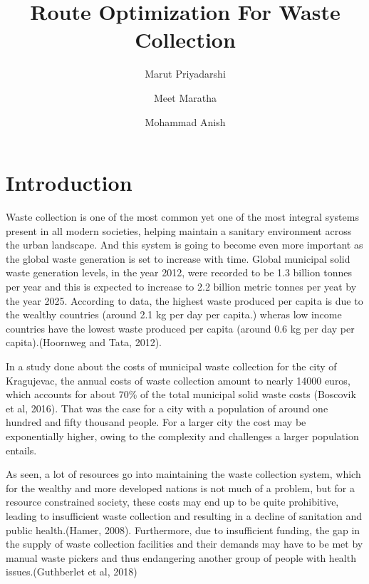 \documentclass[12pt]{article}
\begin{document}

\title{Route Optimization For Waste Collection\\}

\author[1]{Marut Priyadarshi}
\author[2]{Meet Maratha}
\author[3]{Mohammad Anish}

\maketitle

\section{Introduction}
Waste collection is one of the most common yet one of the most integral systems present in all modern societies, helping maintain a sanitary environment across the urban landscape. And this system is going to become even more important as the global waste generation is set to increase with time. Global municipal solid waste generation levels, in the year 2012, were recorded to be 1.3 billion tonnes per year and this is expected to increase to 2.2 billion metric tonnes per yeat by the year 2025. According to data, the highest waste produced per capita is due to the wealthy countries (around 2.1 kg per day per capita.) wheras low income countries have the lowest waste produced per capita (around 0.6 kg per day per capita).(Hoornweg and Tata, 2012).

In a study done about the costs of municipal waste collection for the city of Kragujevac, the annual costs of waste collection amount to nearly 14000 euros, which accounts for about 70\% of the total municipal solid waste costs (Boscovik et al, 2016). That was the case for a city with a population of around one hundred and fifty thousand people. For a larger city the cost may be exponentially higher, owing to the complexity and challenges a larger population entails.

As seen, a lot of resources go into maintaining the waste collection system, which for the wealthy and more developed nations is not much of a problem, but for a resource constrained society, these costs may end up to be quite prohibitive, leading to insufficient waste collection and resulting in a decline of sanitation and public health.(Hamer, 2008). Furthermore, due to insufficient funding, the gap in the supply of waste collection facilities and their demands may have to be met by manual waste pickers and thus endangering another group of people with health issues.(Guthberlet et al, 2018)
\end{document}
